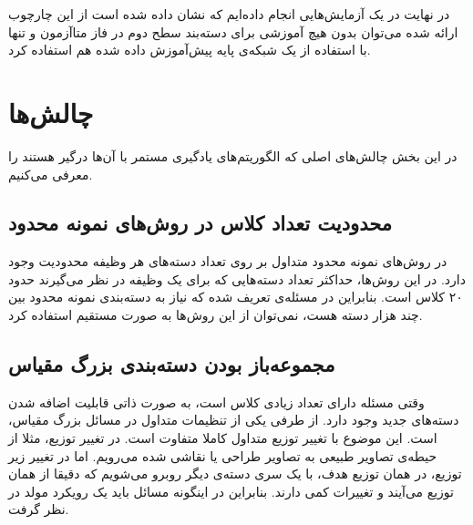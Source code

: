  در نهایت در یک
  آزمایش‌هایی انجام داده‌ایم که نشان داده شده است از این چارچوب ارائه شده می‌توان بدون هیچ آموزشی برای دسته‌بند سطح دوم در فاز متاآزمون و تنها با استفاده از یک شبکه‌ی پایه پیش‌آموزش داده شده هم استفاده کرد.
 
\section{چالش‌ها}\label{sec:challenges}

در این بخش چالش‌های اصلی که الگوریتم‌های یادگیری مستمر با آن‌ها درگیر هستند را معرفی می‌کنیم.

\subsection{محدودیت تعداد کلاس  در روش‌های نمونه محدود}
در روش‌های نمونه محدود متداول
  بر روی تعداد دسته‌های هر وظیفه محدودیت وجود دارد. در این روش‌ها، حداکثر تعداد دسته‌هایی که برای یک وظیفه در نظر می‌گیرند حدود ۲۰ کلاس است. بنابراین در مسئله‌ی تعریف شده که نیاز به دسته‌بندی نمونه محدود بین چند هزار دسته هست، نمی‌توان از این روش‌ها به صورت مستقیم استفاده کرد.
  
\subsection{مجموعه‌باز بودن دسته‌بندی بزرگ مقیاس}

وقتی مسئله دارای تعداد زیادی کلاس است، به صورت ذاتی قابلیت اضافه شدن دسته‌های جدید وجود دارد. از طرفی یکی از تنظیمات متداول در مسائل بزرگ مقیاس،
 است. این موضوع با تغییر توزیع متداول کاملا متفاوت است. در تغییر توزیع، مثلا از حیطه‌ی تصاویر طبیعی به تصاویر طراحی یا نقاشی شده می‌رویم. اما در تغییر زیر توزیع، در همان توزیع هدف، با یک سری دسته‌ی دیگر روبرو می‌شویم که دقیقا از همان توزیع می‌آیند و تغییرات کمی دارند. بنابراین در اینگونه مسائل باید یک رویکرد مولد در نظر گرفت.


